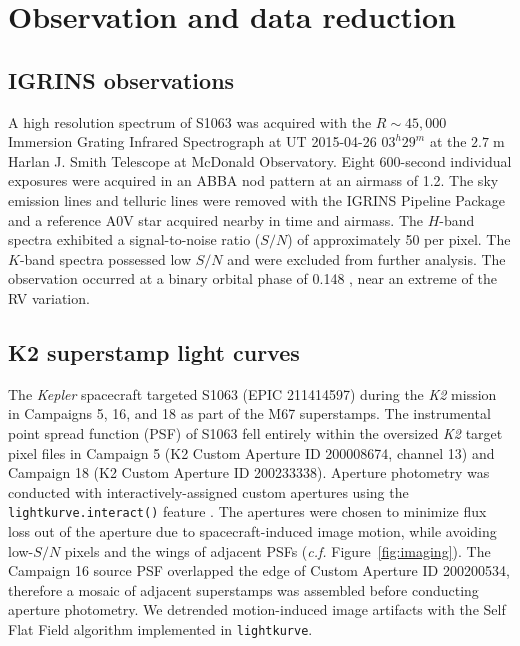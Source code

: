 \documentclass[twocolumn,tighten]{aastex631}
\begin{document}
\section{Observation and data reduction}
\label{sec:observations}


\subsection{IGRINS observations}
A high resolution spectrum of S1063 was acquired with the $R\sim45,000$ Immersion Grating Infrared Spectrograph \citep[IGRINS;][]{park14} at UT 2015-04-26 $03^h29^m$ at the $2.7\;$m Harlan J. Smith Telescope at McDonald Observatory.  Eight 600-second individual exposures were acquired in an ABBA nod pattern at an airmass of 1.2.  The sky emission lines and telluric lines were removed with the IGRINS Pipeline Package  \citep[PLP;][]{jaejoonlee16} and a reference A0V star acquired nearby in time and airmass.
The $H$-band spectra exhibited a signal-to-noise ratio ($S/N$) of approximately 50 per pixel.
The $K$-band spectra possessed low $S/N$ and were excluded from further analysis. The observation occurred at a binary orbital phase of 0.148 \citep[][]{geller2021}, near an extreme of the RV variation. 



\subsection{K2 superstamp light curves}
The \emph{Kepler} spacecraft targeted S1063 (EPIC 211414597) during the \emph{K2} mission \citep{howell14} in Campaigns 5, 16, and 18 as part of the M67 superstamps.  The instrumental point spread function (PSF) of S1063 fell entirely within the oversized \emph{K2} target pixel files in Campaign 5 (K2 Custom Aperture ID 200008674, channel 13) and Campaign 18 (K2 Custom Aperture ID 200233338).  Aperture photometry was conducted with interactively-assigned custom apertures using the \texttt{lightkurve.interact()} feature \citep{geert_barentsen_2019_2565212}. The apertures were chosen to minimize flux loss out of the aperture due to spacecraft-induced image motion, while avoiding low-$S/N$ pixels and the wings of adjacent PSFs (\emph{c.f.} Figure~\ref{fig:imaging}).  The Campaign 16 source PSF overlapped the edge of Custom Aperture ID 200200534, therefore a mosaic of adjacent superstamps was assembled before conducting aperture photometry. We detrended motion-induced image artifacts with the Self Flat Field algorithm \citep{vanderburg14} implemented in \texttt{lightkurve}.
\end{document}
